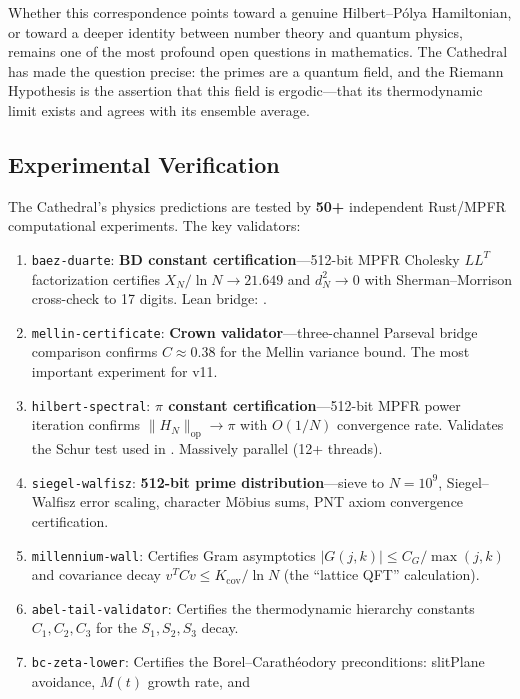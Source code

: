 \documentclass[11pt,a4paper]{article}
\begin{document}
Whether this correspondence points toward a genuine Hilbert--P\'olya
Hamiltonian, or toward a deeper identity between number theory and
quantum physics, remains one of the most profound open questions in
mathematics. The Cathedral has made the question precise: the primes
are a quantum field, and the Riemann Hypothesis is the assertion that
this field is ergodic---that its thermodynamic limit exists and
agrees with its ensemble average.

\subsection{Experimental Verification}

The Cathedral's physics predictions are tested by \textbf{50+} independent
Rust/MPFR computational experiments. The key validators:
\begin{enumerate}
  \item \texttt{baez-duarte}: \textbf{BD constant certification}---512-bit
    MPFR Cholesky $LL^T$ factorization certifies $X_N/\ln N \to 21.649$
    and $d_N^2 \to 0$ with Sherman--Morrison cross-check to 17 digits.
    Lean bridge: .
  \item \texttt{mellin-certificate}: \textbf{Crown validator}---three-channel
    Parseval bridge comparison confirms $C \approx 0.38$ for the Mellin
    variance bound. The most important experiment for v11.
  \item \texttt{hilbert-spectral}: \textbf{$\pi$ constant certification}---512-bit
    MPFR power iteration confirms $\|H_N\|_{\mathrm{op}} \to \pi$ with
    $O(1/N)$ convergence rate. Validates the Schur test used in
    . Massively parallel (12+ threads).
  \item \texttt{siegel-walfisz}: \textbf{512-bit prime distribution}---sieve
    to $N = 10^9$, Siegel--Walfisz error scaling, character M\"obius sums,
    PNT axiom convergence certification.
  \item \texttt{millennium-wall}: Certifies Gram asymptotics
    $|G(j,k)| \leq C_G/\max(j,k)$ and covariance decay
    $v^T C v \leq K_{\mathrm{cov}}/\ln N$ (the ``lattice QFT'' calculation).
  \item \texttt{abel-tail-validator}: Certifies the thermodynamic
    hierarchy constants $C_1, C_2, C_3$ for the $S_1, S_2, S_3$ decay.
  \item \texttt{bc-zeta-lower}: Certifies the Borel--Carath\'eodory
    preconditions: slitPlane avoidance, $M(t)$ growth rate, and

\end{enumerate}
\end{document}
